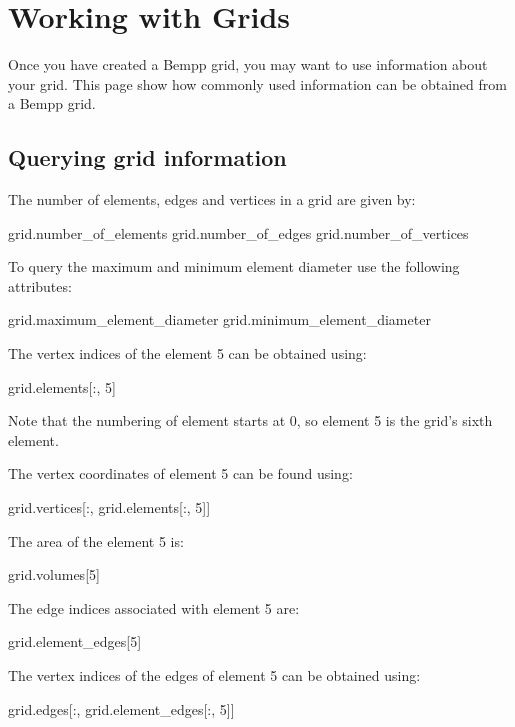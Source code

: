 \documentclass[a4paper]{book}
\begin{document}
\section{Working with Grids}

Once you have created a Bempp grid, you may want to use information about your grid.
This page show how commonly used information can be obtained from a Bempp grid.

\subsection{ Querying grid information}
The number of elements, edges and vertices in a grid are given by:

\begin{python}
grid.number_of_elements
grid.number_of_edges
grid.number_of_vertices
\end{python}

To query the maximum and minimum element diameter use the following attributes:

\begin{python}
grid.maximum_element_diameter
grid.minimum_element_diameter
\end{python}

The vertex indices of the element 5 can be obtained using:

\begin{python}
grid.elements[:, 5]
\end{python}

Note that the numbering of element starts at 0, so element 5 is the grid's sixth element.

The vertex coordinates of element 5 can be found using:

\begin{python}
grid.vertices[:, grid.elements[:, 5]]
\end{python}

The area of the element 5 is:

\begin{python}
grid.volumes[5]
\end{python}

The edge indices associated with element 5 are:

\begin{python}
grid.element_edges[5]
\end{python}

The vertex indices of the edges of element 5 can be obtained using:

\begin{python}
grid.edges[:, grid.element_edges[:, 5]]
\end{python}
\end{document}
